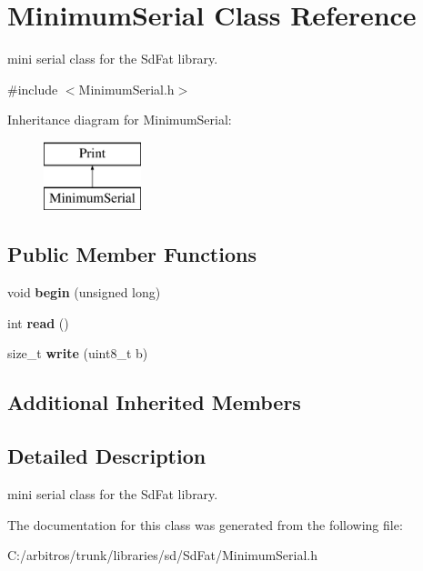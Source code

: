 \hypertarget{class_minimum_serial}{\section{Minimum\-Serial Class Reference}
\label{class_minimum_serial}
}


mini serial class for the Sd\-Fat library.  




{\ttfamily \#include $<$Minimum\-Serial.\-h$>$}

Inheritance diagram for Minimum\-Serial\-:\begin{figure}[H]
\begin{center}
\leavevmode
\includegraphics[height=2.000000cm]{class_minimum_serial}
\end{center}
\end{figure}
\subsection*{Public Member Functions}
\begin{DoxyCompactItemize}
\item 
\hypertarget{class_minimum_serial_ad3fcb1f90c11e7939fcf5079e2d29b89}{void {\bfseries begin} (unsigned long)}\label{class_minimum_serial_ad3fcb1f90c11e7939fcf5079e2d29b89}

\item 
\hypertarget{class_minimum_serial_aaab5dab5b969a87f538242e524431637}{int {\bfseries read} ()}\label{class_minimum_serial_aaab5dab5b969a87f538242e524431637}

\item 
\hypertarget{class_minimum_serial_ac82b138293686567ab5dfbe3ba1fa1ee}{size\-\_\-t {\bfseries write} (uint8\-\_\-t b)}\label{class_minimum_serial_ac82b138293686567ab5dfbe3ba1fa1ee}

\end{DoxyCompactItemize}
\subsection*{Additional Inherited Members}


\subsection{Detailed Description}
mini serial class for the Sd\-Fat library. 

The documentation for this class was generated from the following file\-:\begin{DoxyCompactItemize}
\item 
C\-:/arbitros/trunk/libraries/sd/\-Sd\-Fat/Minimum\-Serial.\-h\end{DoxyCompactItemize}
